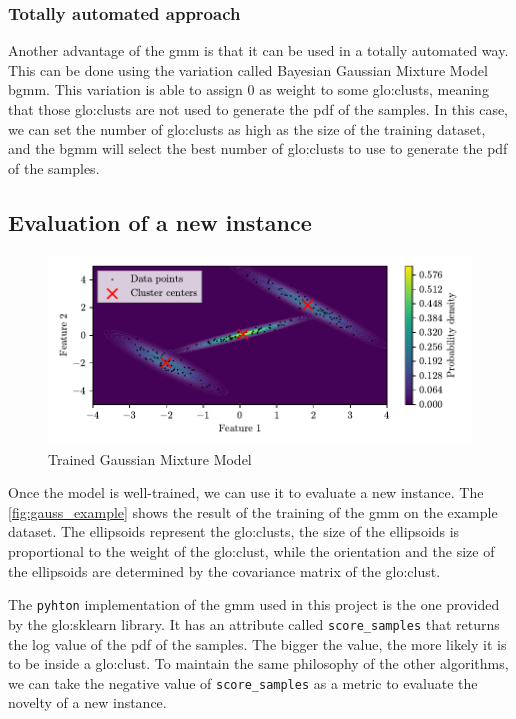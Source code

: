 \subsubsection{Totally automated approach}
\label{sec:gauss_unsupervised}
Another advantage of the \gls{gmm} is that it can be used in a totally automated way. This can be done using the variation called Bayesian Gaussian Mixture Model \gls{bgmm}. This variation is able to assign $0$ as 
weight to some \gls{glo:clust}s, meaning that those \gls{glo:clust}s are not used to generate the \gls{pdf} of the samples. In this case, we can set the number of \gls{glo:clust}s as high as the size of the training dataset, and the \gls{bgmm} will select the best number of \gls{glo:clust}s to use to generate the \gls{pdf} of the samples. 

\subsection{Evaluation of a new instance}
\label{sec:gauss_eval}
\begin{figure}
    \centering
    \includegraphics{images/Gaussian/Figure_2.pdf}
    \caption{Trained Gaussian Mixture Model}
    \label{fig:gauss_example}
\end{figure}
Once the model is well-trained, we can use it to evaluate a new instance. The \autoref{fig:gauss_example} shows the result of the training of the \gls{gmm} on the example dataset. The ellipsoids represent the \gls{glo:clust}s, the size of the ellipsoids is proportional to the weight of the \gls{glo:clust}, while the orientation and the size of the ellipsoids are determined by the covariance matrix of the \gls{glo:clust}. 

The \texttt{pyhton} implementation of the \gls{gmm} used in this project is the one provided by the \gls{glo:sklearn} library. It has an attribute called \texttt{score\_samples} that returns the log value of the \gls{pdf} of the samples.
The bigger the value, the more likely it is to be inside a \gls{glo:clust}. 
To maintain the same philosophy of the other algorithms, we can take the negative value of \texttt{score\_samples} as a metric to evaluate the novelty of a new instance. 

